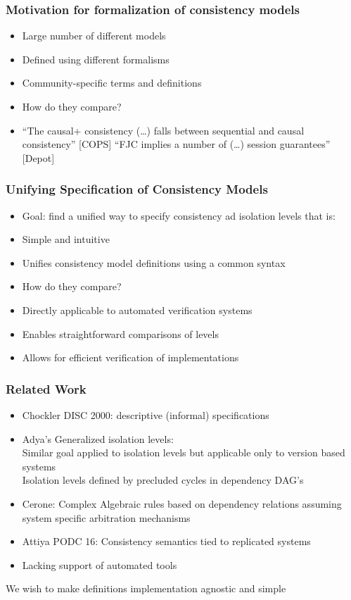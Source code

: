 \documentclass{beamer}
\begin{document}
\begin{frame}
\frametitle{Motivation for formalization of consistency models}
\begin{itemize}
	 \item Large number of different models
 \item Defined using different formalisms
 \item Community-specific terms and definitions
 \item How do they compare?
 \item “The causal+ consistency (…) falls between sequential and causal consistency” [COPS]
“FJC implies a number of (…) session guarantees” [Depot]
\end{itemize}

\end{frame}

\begin{frame}
\frametitle{Unifying Specification of Consistency Models}
\begin{itemize}
	\item Goal: find a unified way to specify consistency ad isolation levels that is:
	\item Simple and intuitive
	\item Unifies consistency model definitions using a common syntax
	\item How do they compare?
	\item Directly applicable to automated verification  systems
	\item Enables straightforward comparisons of levels
	\item Allows for efficient verification of implementations
\end{itemize}

\end{frame}
 
 \begin{frame}
 \frametitle{Related Work}
 \begin{itemize}
 	\item Chockler DISC 2000: descriptive (informal) specifications
 	\item Adya’s Generalized isolation levels: \\
 		Similar goal applied to isolation levels but applicable only to version based systems\\
 		Isolation levels defined by precluded cycles in dependency DAG's
 	\item Cerone: Complex Algebraic rules based on dependency relations assuming system specific arbitration mechanisms
 	\item Attiya PODC 16: Consistency semantics tied to replicated systems
 	\item Lacking support of automated tools
 	
 \end{itemize}
 We wish to make definitions implementation agnostic and simple
\end{frame}
 
\end{document}
